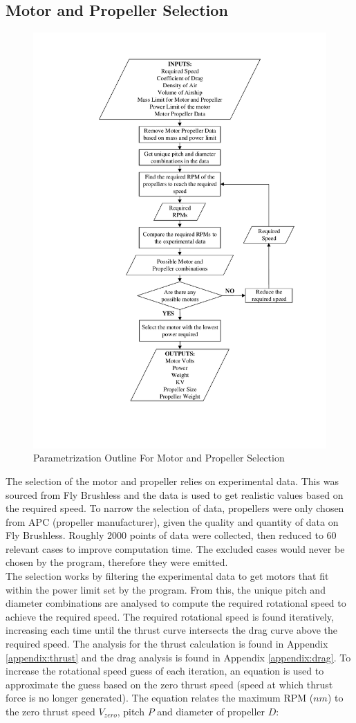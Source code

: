 \documentclass[../main.tex]{subfiles}
\begin{document}
\subsection{Motor and Propeller Selection} \label{motorSelect}

\begin{figure}[H]
	\centering
	\includegraphics[width=0.7\linewidth]{img/paramaterization/motorPropellerChoice.pdf}
	\caption{Parametrization Outline For Motor and Propeller Selection}
	\label{fig:motorOutline}
\end{figure}

The selection of the motor and propeller relies on experimental data. This was sourced from Fly Brushless \cite{motPropData} and the data is used to get realistic values based on the required speed. To narrow the selection of data, propellers were only chosen from APC (propeller manufacturer), given the quality and quantity of data on Fly Brushless. Roughly 2000 points of data were collected, then reduced to 60 relevant cases to improve computation time. The excluded cases would never be chosen by the program, therefore they were emitted.\\

The selection works by filtering the experimental data to get motors that fit within the power limit set by the program. From this, the unique pitch and diameter combinations are analysed to compute the required rotational speed to achieve the required speed. The required rotational speed is found iteratively, increasing each time until the thrust curve intersects the drag curve above the required speed. The analysis for the thrust calculation is found in Appendix \ref{appendix:thrust} and the drag analysis is found in Appendix \ref{appendix:drag}. To increase the rotational speed guess of each iteration, an equation is used to approximate the guess based on the zero thrust speed (speed at which thrust force is no longer generated). The equation relates the maximum RPM ($nm$) to the zero thrust speed $V_{zero}$, pitch $P$ and diameter of propeller $D$:
\end{document}
